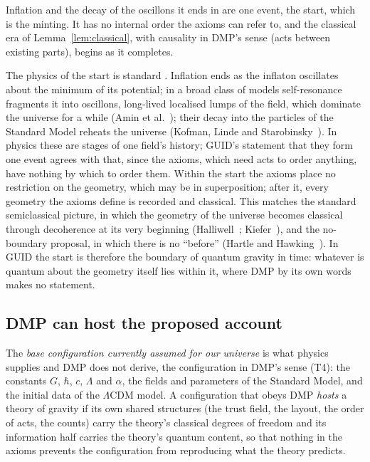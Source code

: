 \begin{hypothesis}\label{h:minting}
Inflation and the decay of the oscillons it ends in are one event, the start, which is the minting. It has no internal order the axioms can
refer to, and the classical era of Lemma~\ref{lem:classical}, with causality in DMP's sense (acts between existing parts), begins as it
completes. \tagH
\end{hypothesis}

The physics of the start is standard \tagP. Inflation ends as the inflaton oscillates about the minimum of its potential; in a broad class
of models self-resonance fragments it into oscillons, long-lived localised lumps of the field, which dominate the universe for a while
(Amin et al.~\cite{amin}); their decay into the particles of the Standard Model reheats the universe (Kofman, Linde and
Starobinsky~\cite{kls}). In physics these are stages of one field's history; GUID's statement that they form one event agrees with that,
since the axioms, which need acts to order anything, have nothing by which to order them. Within the start the axioms place no restriction
on the geometry, which may be in superposition; after it, every geometry the axioms define is recorded and classical. This matches the
standard semiclassical picture, in which the geometry of the universe becomes classical through decoherence at its very beginning
(Halliwell~\cite{halliwell}; Kiefer~\cite{kiefer87}), and the no-boundary proposal, in which there is no ``before'' (Hartle and
Hawking~\cite{hartlehawking}). In GUID the start is therefore the boundary of quantum gravity in time: whatever is quantum about the
geometry itself lies within it, where DMP by its own words makes no statement.

\subsection{DMP can host the proposed account}\label{sec:host}

\begin{definition}\label{def:model}
The \emph{base configuration currently assumed for our universe} is what physics supplies and DMP does not derive, the configuration in
DMP's sense (T4): the constants $G$, $\hbar$, $c$, $\Lambda$ and $\alpha$, the fields and parameters of the Standard Model, and the initial
data of the $\Lambda$CDM model. A configuration that obeys DMP \emph{hosts} a theory of gravity if its own shared structures (the trust
field, the layout, the order of acts, the counts) carry the theory's classical degrees of freedom and its information half carries the
theory's quantum content, so that nothing in the axioms prevents the configuration from reproducing what the theory predicts.
\end{definition}

